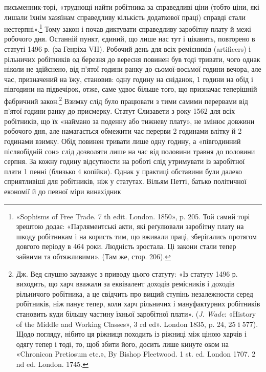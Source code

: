 \parcont{}  %
письменник-торі, «труднощі найти робітника за справедливі
ціни (тобто ціни, які лишали їхнім хазяїнам справедливу кількість
додаткової праці) справді стали нестерпні».\footnote{
«Sophisms of Free Trade. 7 th edit. London. 1850», p. 205. Той
самий торі зрештою додає: «Парляментські акти, які реґулювали заробітну
плату на шкоду робітникам і на користь тим, що вживали праці,
зберігались протягом довгого періоду в 464 роки. Людність зростала.
Ці закони стали тепер зайвими та обтяжливими». (Там же, стор. 206).
} Тому закон і
почав диктувати справедливу заробітну плату й межі робочого
дня. Останній пункт, єдиний, що лише нас тут і цікавить, повторено
в статуті 1496 р. (за Генріха VII). Робочий день для всіх
ремісників (artificers) і рільничих робітників од березня до вересня
повинен був тоді тривати, чого однак ніколи не здійснено,
від п’ятої години ранку до сьомої-восьмої години вечора,
але час, призначений на їжу, становив: одну годину на сніданок,
1 години на обід і півгодини на підвечірок, отже, саме
удвоє більше того, що призначає теперішній фабричний закон.\footnote{
Дж. Вед слушно зауважує з приводу цього статуту: «Із статуту
1496 р. виходить, що харч вважали за еквівалент  доходів ремісників
і  доходів рільничого робітника, а це свідчить про вищий ступінь незалежности
серед робітників, ніж панує тепер, коли харч рільничих і мануфактурних
робітників становить куди більшу частину їхньої заробітної
плати». (\emph{J. Wade}: «History of the Middle and Working Classes», 3 rd
ed». London 1835, p. 24, 25 і 577). Щодо погляду, нібито ця ріжниця
походить із ріжниці між ціною харчів і одягу тепер і тоді, то, щоб збити
його, досить лише кинуте оком на «Chronicon Pretiosum etc.», By Bishop
Fleetwood. 1 st. ed. London 1707. 2 nd ed. London. 1745.
} Взимку слід було працювати з тими самими перервами від п’ятої
години ранку до присмерку. Статут Єлизавети з року 1562 для
всіх робітників, що їх «наймано за поденну або тижневу плату»,
не змінює довжини робочого дня, але намагається обмежити час
перерви 2 годинами влітку й 2 годинами взимку. Обід повинен
тривати лише одну годину, а «півгодинний післяобідній сон» слід
дозволяти лише на час від половини травня до половини серпня.
За кожну годину відсутности на роботі слід утримувати із заробітної
плати 1 пенні (близько 4 копійки). Однак у практиці обставини
були далеко сприятливіші для робітників, ніж у статутах.
Вільям Петті, батько політичної економії й до певної міри винахідник
